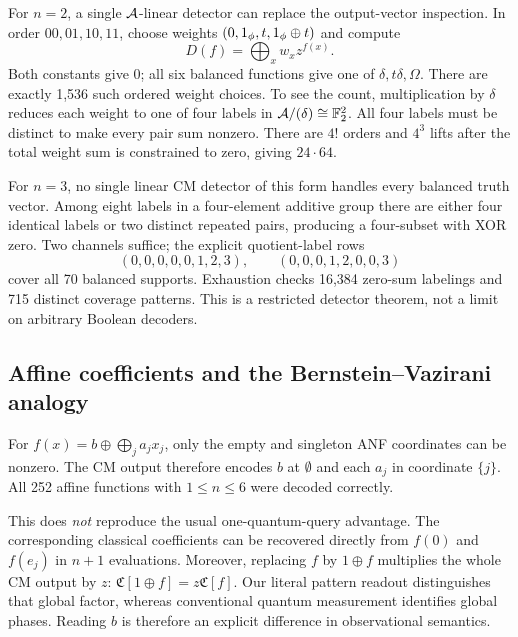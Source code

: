 For $n=2$, a single $\mathcal A$-linear detector can replace the output-vector inspection. In order $00,01,10,11$, choose weights $(0,1_{\phi},t,1_{\phi}\oplus t)$ and compute
\begin{equation}
 D(f)=\bigoplus_x w_x z^{f(x)}.
\end{equation}
Both constants give 0; all six balanced functions give one of $\delta,t\delta,\Omega$. There are exactly 1,536 such ordered weight choices. To see the count, multiplication by $\delta$ reduces each weight to one of four labels in $\mathcal A/(\delta)\cong\mathbb F_2^2$. All four labels must be distinct to make every pair sum nonzero. There are $4!$ orders and $4^3$ lifts after the total weight sum is constrained to zero, giving $24\cdot64$.

For $n=3$, no single linear CM detector of this form handles every balanced truth vector. Among eight labels in a four-element additive group there are either four identical labels or two distinct repeated pairs, producing a four-subset with XOR zero. Two channels suffice; the explicit quotient-label rows
\begin{equation}
 (0,0,0,0,0,1,2,3),\qquad(0,0,0,1,2,0,0,3)
\end{equation}
cover all 70 balanced supports. Exhaustion checks 16,384 zero-sum labelings and 715 distinct coverage patterns. This is a restricted detector theorem, not a limit on arbitrary Boolean decoders.

\subsection{Affine coefficients and the Bernstein--Vazirani analogy}
For $f(x)=b\oplus\bigoplus_j a_jx_j$, only the empty and singleton ANF coordinates can be nonzero. The CM output therefore encodes $b$ at $\emptyset$ and each $a_j$ in coordinate $\{j\}$. All 252 affine functions with $1\le n\le6$ were decoded correctly.

This does \emph{not} reproduce the usual one-quantum-query advantage. The corresponding classical coefficients can be recovered directly from $f(0)$ and $f(e_j)$ in $n+1$ evaluations. Moreover, replacing $f$ by $1\oplus f$ multiplies the whole CM output by $z$: $\mathfrak C[1\oplus f]=z\mathfrak C[f]$. Our literal pattern readout distinguishes that global factor, whereas conventional quantum measurement identifies global phases. Reading $b$ is therefore an explicit difference in observational semantics.

